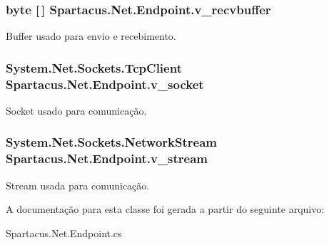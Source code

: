 \hypertarget{classSpartacus_1_1Net_1_1Endpoint_ae3632e1b74fb0004d1c7fde3b04c8b29}{
\subsubsection[{v\+\_\+recvbuffer}]{\setlength{\rightskip}{0pt plus 5cm}byte \mbox{[}$\,$\mbox{]} Spartacus.\+Net.\+Endpoint.\+v\+\_\+recvbuffer}}\label{classSpartacus_1_1Net_1_1Endpoint_ae3632e1b74fb0004d1c7fde3b04c8b29}


Buffer usado para envio e recebimento. 

\hypertarget{classSpartacus_1_1Net_1_1Endpoint_afcd542885167aee45f37ea3001de130a}{
\subsubsection[{v\+\_\+socket}]{\setlength{\rightskip}{0pt plus 5cm}System.\+Net.\+Sockets.\+Tcp\+Client Spartacus.\+Net.\+Endpoint.\+v\+\_\+socket}}\label{classSpartacus_1_1Net_1_1Endpoint_afcd542885167aee45f37ea3001de130a}


Socket usado para comunicação. 

\hypertarget{classSpartacus_1_1Net_1_1Endpoint_aae1759d93346f39b926884b5ac3544cd}{
\subsubsection[{v\+\_\+stream}]{\setlength{\rightskip}{0pt plus 5cm}System.\+Net.\+Sockets.\+Network\+Stream Spartacus.\+Net.\+Endpoint.\+v\+\_\+stream}}\label{classSpartacus_1_1Net_1_1Endpoint_aae1759d93346f39b926884b5ac3544cd}


Stream usada para comunicação. 



A documentação para esta classe foi gerada a partir do seguinte arquivo\+:\begin{DoxyCompactItemize}
\item 
Spartacus.\+Net.\+Endpoint.\+cs\end{DoxyCompactItemize}
